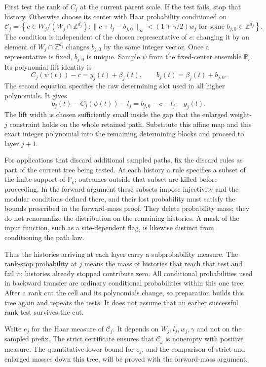 First test the rank of $C_j$ at the current parent scale.  If the test
fails, stop that history.  Otherwise choose its center with Haar
probability conditioned on
\begin{equation}\label{ap:scalar:feasible-center}
 \mathcal C_j=
 \left\{c\in W_j/(W_j\cap\mathbb Z^{d_j}):
       \|c+l_j-b_{j,0}\|_\infty<(1+\gamma/2)w_j
       \text{ for some }b_{j,0}\in\mathbb Z^{d_j}\right\}.
\end{equation}
The condition is independent of the chosen representative of $c$:
changing it by an element of $W_j\cap\mathbb Z^{d_j}$ changes
$b_{j,0}$ by the same integer vector.  Once a representative is fixed,
$b_{j,0}$ is unique.  Sample $\psi$ from the fixed-center ensemble
$\mathbb P_c$.  Its polynomial lift identity is
\[
 C_j(\psi(t))-c=y_j(t)+\beta_j(t),
                    \qquad b_j(t)=\beta_j(t)+b_{j,0}.
\]
The second equation specifies the raw determining slot used in all
higher polynomials.  It gives
\[
 b_j(t)-C_j(\psi(t))-l_j
                   =b_{j,0}-c-l_j-y_j(t).
\]
The lift width is chosen sufficiently small inside the gap that the
enlarged weight-$j$ constraint holds on the whole retained path.
Substitute this affine map and this exact integer polynomial into the
remaining determining blocks and proceed to layer $j+1$.

For applications that discard additional sampled paths, fix the
discard rules as part of the current tree being tested.  At each
history a rule specifies a subset of the finite support of
$\mathbb P_c$; outcomes outside that subset are killed before
proceeding.  In the forward argument these subsets impose injectivity
and the modular conditions defined there, and their lost probability
must satisfy the bounds prescribed in the forward-mass proof.
They delete probability mass; they do not renormalize
the distribution on the remaining histories.  A mask of the input
function, such as a site-dependent flag, is likewise distinct from
conditioning the path law.

Thus the histories arriving at each layer carry a subprobability
measure.  The rank-stop probability at $j$ means the mass of histories
that reach that test and fail it; histories already stopped contribute
zero.  All conditional probabilities used in backward transfer are
ordinary conditional probabilities within this one tree.  After a
rank cut the cell and its polynomials change, so preparation builds
this tree again and repeats the tests.  It does not assume that an
earlier successful rank test survives the cut.

Write $e_j$ for the Haar measure of $\mathcal C_j$.  It depends on
$W_j,l_j,w_j,\gamma$ and not on the sampled prefix.  The strict
certificate ensures that $\mathcal C_j$ is nonempty with positive
measure.  The quantitative lower bound for $e_j$, and the comparison
of strict and enlarged masses down this tree, will be proved with
the forward-mass argument.

